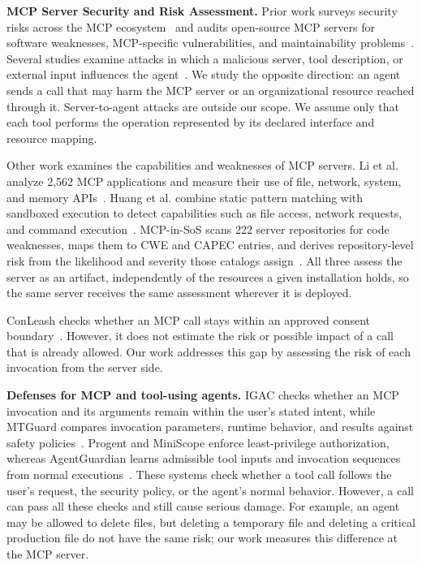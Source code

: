 \documentclass[sigconf]{acmart}
\begin{document}
\textbf{MCP Server Security and Risk Assessment.} 
Prior work surveys security risks across the MCP
ecosystem~\cite{hou2026mcp} and audits open-source MCP servers for
software weaknesses, MCP-specific vulnerabilities, and maintainability
problems~\cite{hasan2025firstglance}. Several studies examine attacks in which
a malicious server, tool description, or external input influences the
agent~\cite{invariant2025toolpoisoning,shi2025toolhijacker,
zhao2025parasites}. We study the opposite direction: an agent sends a call that
may harm the MCP server or an organizational resource reached through it.
Server-to-agent attacks are outside our scope. We assume only that each tool
performs the operation represented by its declared interface and resource
mapping.

Other work examines the capabilities and weaknesses of MCP servers. Li et al.
analyze 2,562 MCP applications and measure their use of file, network, system,
and memory APIs~\cite{li2025privilege}. Huang et al. combine static pattern
matching with sandboxed execution to detect capabilities such as file access,
network requests, and command execution~\cite{huang2026auditing}. MCP-in-SoS
scans 222 server repositories for code weaknesses, maps them to CWE and CAPEC
entries, and derives repository-level risk from the likelihood and severity
those catalogs assign~\cite{kumar2026mcpinsos}. All three assess the server as
an artifact, independently of the resources a given installation holds, so the
same server receives the same assessment wherever it is deployed.

ConLeash checks whether an MCP call stays within an approved consent boundary~\cite{li2026conleash}. However, it does not estimate the risk or possible impact of a call that is already allowed. Our work addresses this gap by assessing the risk of each invocation from the server side.




\textbf{Defenses for MCP and tool-using agents.} 
IGAC checks whether an MCP invocation and its arguments remain within the user’s stated intent, while MTGuard compares invocation parameters, runtime behavior, and results against safety policies~\cite{zhu2026igac,he2026mtguard}. Progent and MiniScope enforce least-privilege authorization, whereas AgentGuardian learns admissible tool inputs and invocation sequences from normal executions~\cite{shi2025progent,zhu2025miniscope,abaev2026agentguardian}. These systems check whether a tool call follows the user’s request, the security policy, or the agent’s normal behavior. However, a call can pass all these checks and still cause serious damage. For example, an agent may be allowed to delete files, but deleting a temporary file and deleting a critical production file do not have the same risk; our work measures this difference at the MCP server.
\end{document}
